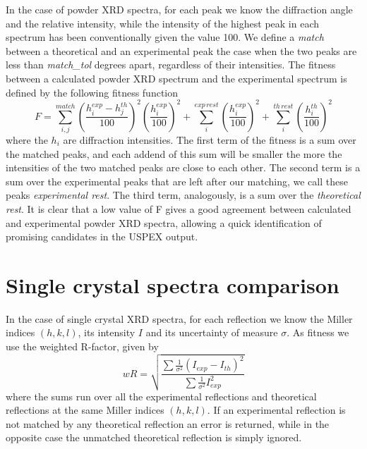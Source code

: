 \documentclass{article}
\begin{document}
In the case of powder XRD spectra, for each peak we know the diffraction angle and the relative intensity, while the intensity of the highest peak in each spectrum has been conventionally given the value 100. We define a \emph{match} between a theoretical and an experimental peak the case when the two peaks are less than \emph{match\_tol} degrees apart, regardless of their intensities. The fitness between a calculated powder XRD spectrum and the experimental spectrum is defined by the following fitness function
\begin{equation*}
	F = \sum_{i, j}^{match} \left( \frac{h_i^{exp} - h_j^{th}}{100} \right)^2 \left( \frac{h_i^{exp}}{100} \right)^2 + \sum_i^{exp \, rest} \left( \frac{h_i^{exp}}{100} \right)^2 + \sum_i^{th \, rest} \left( \frac{h_i^{th}}{100} \right)^2
\end{equation*}
where the $h_i$ are diffraction intensities. The first term of the fitness is a sum over the matched peaks, and each addend of this sum will be smaller the more the intensities of the two matched peaks are close to each other. The second term is a sum over the experimental peaks that are left after our matching, we call these peaks \emph{experimental rest}. The third term, analogously, is a sum over the \emph{theoretical rest}. It is clear that a low value of F gives a good agreement between calculated and experimental powder XRD spectra, allowing a quick identification of promising candidates in the USPEX output.

\section{Single crystal spectra comparison}
\label{sec:scspectracomp}

In the case of single crystal XRD spectra, for each reflection we know the Miller indices $(h, k, l)$, its intensity $I$ and its uncertainty of measure $\sigma$. As fitness we use the weighted R-factor, given by
\[
	wR = \sqrt{\frac{\sum \frac{1}{\sigma^2} (I_{exp} - I_{th})^2}{\sum \frac{1}{\sigma^2} I_{exp}^2}}
\]
where the sums run over all the experimental reflections and theoretical reflections at the same Miller indices $(h, k, l)$. If an experimental reflection is not matched by any theoretical reflection an error is returned, while in the opposite case the unmatched theoretical reflection is simply ignored.
\end{document}
